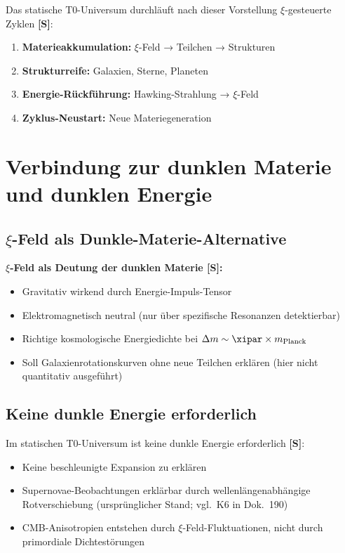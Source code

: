 	Das statische T0-Universum durchläuft nach dieser Vorstellung $\xi$-gesteuerte Zyklen \textbf{[S]}:
	
	\begin{enumerate}
		\item \textbf{Materieakkumulation:} $\xi$-Feld → Teilchen → Strukturen
		\item \textbf{Strukturreife:} Galaxien, Sterne, Planeten
		\item \textbf{Energie-Rückführung:} Hawking-Strahlung → $\xi$-Feld
		\item \textbf{Zyklus-Neustart:} Neue Materiegeneration
	\end{enumerate}
	
	\section{Verbindung zur dunklen Materie und dunklen Energie}
	
	\subsection{$\xi$-Feld als Dunkle-Materie-Alternative}
	
	\begin{keyresult}
		\textbf{$\xi$-Feld als Deutung der dunklen Materie [S]:}
		
		\begin{itemize}
			\item Gravitativ wirkend durch Energie-Impuls-Tensor
			\item Elektromagnetisch neutral (nur über spezifische Resonanzen detektierbar)
			\item Richtige kosmologische Energiedichte bei $\Delta m \sim \xipar \times m_{\text{Planck}}$
			\item Soll Galaxienrotationskurven ohne neue Teilchen erklären (hier nicht quantitativ ausgeführt)
		\end{itemize}
	\end{keyresult}
	
	\subsection{Keine dunkle Energie erforderlich}
	
	Im statischen T0-Universum ist keine dunkle Energie erforderlich \textbf{[S]}:
	
	\begin{itemize}
		\item Keine beschleunigte Expansion zu erklären
		\item Supernovae-Beobachtungen erklärbar durch wellenlängenabhängige Rotverschiebung (ursprünglicher Stand; vgl.\ K6 in Dok.~190)
		\item CMB-Anisotropien entstehen durch $\xi$-Feld-Fluktuationen, nicht durch primordiale Dichtestörungen
	\end{itemize}
	
